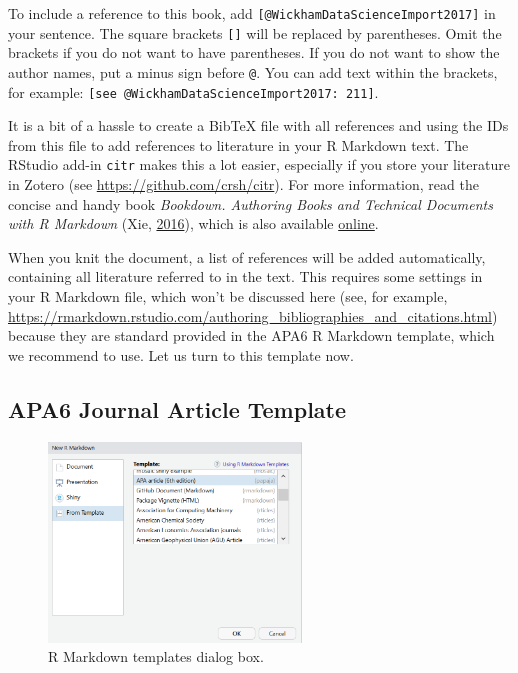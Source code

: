 \documentclass[doc,floatsintext]{apa6}
\begin{document}
To include a reference to this book, add
\texttt{{[}@WickhamDataScienceImport2017{]}} in your sentence. The
square brackets \texttt{{[}{]}} will be replaced by parentheses. Omit
the brackets if you do not want to have parentheses. If you do not want
to show the author names, put a minus sign before \texttt{@}. You can
add text within the brackets, for example:
\texttt{{[}see\ @WickhamDataScienceImport2017:\ 211{]}}.

It is a bit of a hassle to create a BibTeX file with all references and
using the IDs from this file to add references to literature in your R
Markdown text. The RStudio add-in \texttt{citr} makes this a lot easier,
especially if you store your literature in Zotero (see
\url{https://github.com/crsh/citr}). For more information, read the
concise and handy book \emph{Bookdown. Authoring Books and Technical
Documents with R Markdown} (Xie,
\protect\hyperlink{ref-xieBookdownAuthoringBooks2016}{2016}), which is
also available
\href{https://bookdown.org/yihui/bookdown/citations.html}{online}.

When you knit the document, a list of references will be added
automatically, containing all literature referred to in the text. This
requires some settings in your R Markdown file, which won't be discussed
here (see, for example,
\url{https://rmarkdown.rstudio.com/authoring_bibliographies_and_citations.html})
because they are standard provided in the APA6 R Markdown template,
which we recommend to use. Let us turn to this template now.

\subsection{APA6 Journal Article Template}\label{apa6template}

\begin{figure}
\includegraphics[width=2.65in]{template} \caption{R Markdown templates dialog box.}\label{fig:template}
\end{figure}
\end{document}
